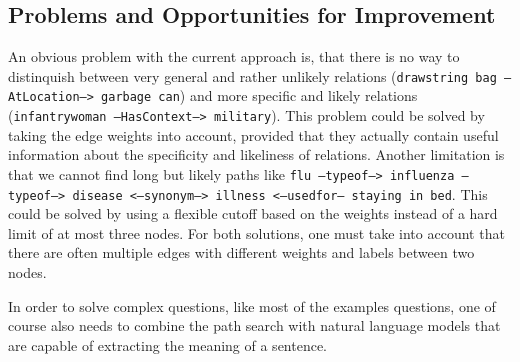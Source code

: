 \documentclass{article}
\begin{document}
\subsection*{Problems and Opportunities for Improvement}
\label{sec:probl-opport-impr}

An obvious problem with the current approach is, that there is no way
to distinquish between very general and rather unlikely relations
(\texttt{drawstring bag --AtLocation--> garbage can}) and more
specific and likely relations (\texttt{infantrywoman --HasContext-->
  military}).  This problem could be solved by taking the edge weights
into account, provided that they actually contain useful information
about the specificity and likeliness of relations.  Another limitation
is that we cannot find long but likely paths like \texttt{flu
  --typeof--> influenza --typeof--> disease <--synonym--> illness
  <--usedfor-- staying in bed}. This could be solved by using a
flexible cutoff based on the weights instead of a hard limit of at
most three nodes.  For both solutions, one must take into account that
there are often multiple edges with different weights and labels
between two nodes.

In order to solve complex questions, like most of the examples questions, one of
course also needs to combine the path search with natural language models
that are capable of extracting the meaning of a sentence.






\end{document}
